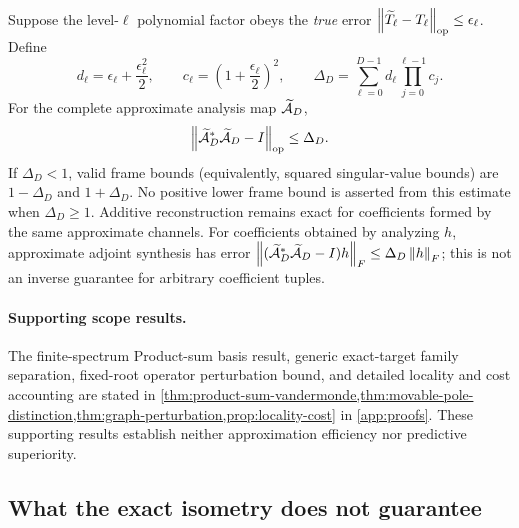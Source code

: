 \begin{theorem}
\label{thm:finite-frame}
Suppose the level-$\ell$ polynomial factor obeys the \emph{true} error
$\left\lVert \widetilde T_\ell-T_\ell\right\rVert_{\mathrm{op}}\leq\epsilon_\ell$.  Define
\begin{equation}
 d_\ell=\epsilon_\ell+\frac{\epsilon_\ell^2}{2},
 \qquad c_\ell=\left(1+\frac{\epsilon_\ell}{2}\right)^2,
 \qquad
 \Delta_D=\sum_{\ell=0}^{D-1}d_\ell
              \prod_{j=0}^{\ell-1}c_j.
 \label{eq:finite-delta}
\end{equation}
For the complete approximate analysis map $\widetilde{\mathcal A}_D$,
\begin{equation}
 \left\lVert \widetilde{\mathcal A}_D^*\widetilde{\mathcal A}_D-I\right\rVert_{\mathrm{op}}\leq\Delta_D.
 \label{eq:finite-frame-distortion}
\end{equation}
If $\Delta_D<1$, valid frame bounds (equivalently, squared singular-value
bounds) are $1-\Delta_D$ and $1+\Delta_D$.  No positive lower frame bound is
asserted from this estimate when $\Delta_D\geq1$.  Additive reconstruction remains exact for coefficients
formed by the same approximate channels.  For coefficients obtained by
analyzing $h$, approximate adjoint synthesis has error
$\left\lVert (\widetilde{\mathcal A}_D^*\widetilde{\mathcal A}_D-I)h\right\rVert_F
\leq\Delta_D\left\lVert h\right\rVert_F$; this is not an inverse guarantee for arbitrary
coefficient tuples.
\end{theorem}

\paragraph{Supporting scope results.}
The finite-spectrum Product-sum basis result, generic exact-target family
separation, fixed-root operator perturbation bound, and detailed locality and
cost accounting are stated in
\cref{thm:product-sum-vandermonde,thm:movable-pole-distinction,thm:graph-perturbation,prop:locality-cost}
in \cref{app:proofs}.  These supporting results establish neither approximation
efficiency nor predictive superiority.

\subsection{What the exact isometry does not guarantee}

